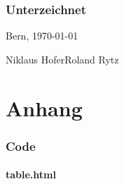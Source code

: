 \documentclass[11pt,paper=a4,final]{scrartcl}
\begin{document}
\section{Unterzeichnet}
Bern, \today{}

\vspace{0.5cm}
\noindent
Niklaus Hofer\hfill Roland Rytz

\vspace{2cm}
\noindent
\hrulefill \hfill \hrulefill
\newpage
\listoftables
\listoffigures
{}


\part{Anhang}
\label{part:anhang}
\section{Code}
\subsection{table.html}
\lstset{language=JavaScript,frame=single,breaklines=true}

\end{document}
